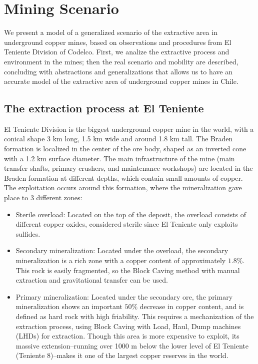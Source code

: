 \newpage
\section{Mining Scenario}

We present a model of a generalized scenario of the extractive area in underground copper mines, based on observations and procedures from El Teniente Division of Codelco. First, we analize the extractive process and environment in the mines; then the real scenario and mobility are described, concluding with abstractions and generalizations that allows us to have an accurate model of the extractive area of underground copper mines in Chile.

\subsection{The extraction process at El Teniente}

El Teniente Division is the biggest underground copper mine in the world, with a conical shape 3 km long, 1.5 km wide and around 1.8 km tall. The Braden formation is localized in the center of the ore body, shaped as an inverted cone with a 1.2 km surface diameter. The main infrastructure of the mine (main transfer shafts, primary crushers, and maintenance workshops) are located in the Braden formation at different depths, which contain small amounts of copper. The exploitation occurs around this formation, where the mineralization gave place to 3 different zones:

\begin{itemize}
    \item Sterile overload: Located on the top of the deposit, the overload consists of different copper oxides, considered sterile since El Teniente only exploits sulfides.
    \item Secondary mineralization: Located under the overload, the secondary mineralization is a rich zone with a copper content of approximately $1.8\%$. This rock is easily fragmented, so the Block Caving method with manual extraction and gravitational transfer can be used.
    \item Primary mineralization: Located under the secondary ore, the primary mineralization shows an important $50\%$ decrease in copper content, and is defined as hard rock with high friability. This requires a mechanization of the extraction process, using Block Caving with Load, Haul, Dump machines (LHDs) for extraction. Though this area is more expensive to exploit, its massive extension–running over 1000 m below the lower level of El Teniente (Teniente 8)–makes it one of the largest copper reserves in the world.

\end{itemize}

